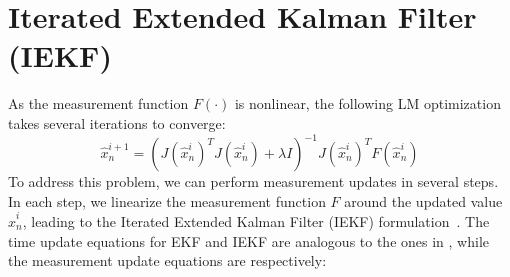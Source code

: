 \clearpage
\section{Iterated Extended Kalman Filter (IEKF)}
\label{app:iekf}
As the measurement function $F(\cdot)$ is nonlinear, the following LM optimization takes several iterations to converge: 
\begin{equation}
\hat{x}_n^{i + 1} = (J(\hat{x}_n^i) ^T J(\hat{x}_n^i) + \lambda I)^{-1} J(\hat{x}_n^i)^T F(\hat{x}_n^i)   
\end{equation}
To address this problem, we can perform measurement updates in several steps. In each step, we linearize the measurement function $F$ around the updated value $\hat{x}_n^i$, leading to the Iterated Extended Kalman Filter (IEKF) formulation~\cite{havlik2015performance}. The time update equations for EKF and IEKF are analogous to the ones in , while the measurement update equations are respectively:
\begin{table}[!h] 
\centering
{}
\caption{EKF vs. IEKF measurement update equations \label{tab:ekf-iekf}}
\end{table}


